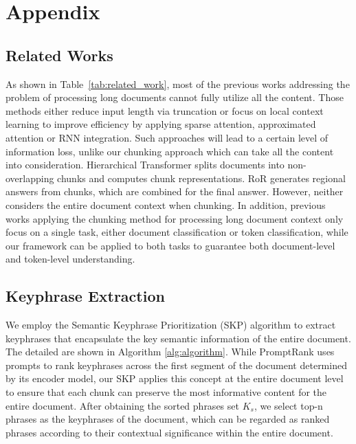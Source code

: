 \documentclass[11pt]{article}
\begin{document}





\appendix
\newpage
\section{Appendix}
\subsection{Related Works}
\label{app:related_works}

As shown in Table~\ref{tab:related_work}, most of the previous works addressing the problem of processing long documents cannot fully utilize all the content. Those methods either reduce input length via truncation or focus on local context learning to improve efficiency by applying sparse attention, approximated attention or RNN integration. Such approaches will lead to a certain level of information loss, unlike our chunking approach which can take all the content into consideration.
Hierarchical Transformer \citep{pappagari2019hierarchical} splits documents into non-overlapping chunks and computes chunk representations. RoR \citep{zhao2021ror} generates regional answers from chunks, which are combined for the final answer. However, neither considers the entire document context when chunking.
In addition, previous works applying the chunking method for processing long document context only focus on a single task, either document classification or token classification, while our framework can be applied to both tasks to guarantee both document-level and token-level understanding.

\subsection{Keyphrase Extraction}
\label{app:algorithm}
We employ the Semantic Keyphrase Prioritization (SKP) algorithm to extract keyphrases that encapsulate the key semantic information of the entire document. The detailed are shown in Algorithm \ref{alg:algorithm}.
While PromptRank uses prompts to rank keyphrases across the first segment of the document determined by its encoder model, our SKP applies this concept at the entire document level to ensure that each chunk can preserve the most informative content for the entire document. After obtaining the sorted phrases set $K_s$, we select top-n phrases as the keyphrases of the document, which can be regarded as ranked phrases according to their contextual significance within the entire document.
\end{document}
